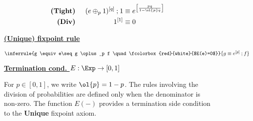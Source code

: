 \begin{figure*}
\begin{multicols}{2}
\begin{alignat*}{4}
		\textbf{(Tight)} & \;\, 
		& (e \oplus_p 1)^{[q]} \seq 1 & {} \equiv e^{\left[\frac{pq}{1-\ol{p}q}\right]} \\[-0.25ex]
		\textbf{(Div)} & \;\, 
		& 1^{[1]} & {} \equiv 0 \\
        \end{alignat*}
          \begin{flushleft}   \underline{\bf (Unique) fixpoint rule} \end{flushleft}
		$\inferrule{g \equiv e\seq g \oplus_p f \quad \fcolorbox{red}{white}{$E(e)=0$}}{g \equiv e^{[p]}\seq f}$
\end{multicols}
        \vspace{-.5cm}
     \begin{flushleft}    \underline{\bf Termination cond. $E : \Exp \to [0,1]$} \end{flushleft}
        \caption{\label{fig:axioms} For $p \in [0,1]$, we write $\ol{p}=1-p$. The rules involving the division of probabilities are defined only when the denominator is non-zero. The function $E(-)$ provides a termination side condition to the \textbf{Unique} fixpoint axiom.}
            \vspace{-.4cm}
    \end{figure*}
